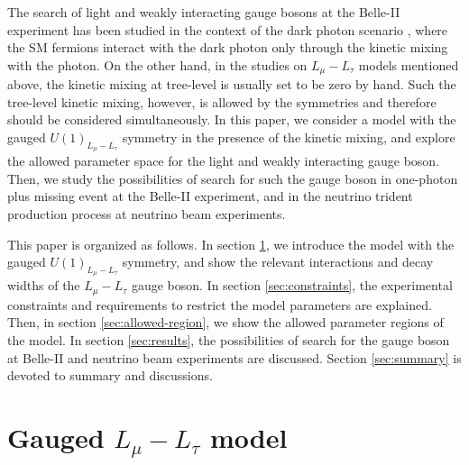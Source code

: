 \documentclass[preprint,amsmath,amssymb,superscriptaddress,nofootinbib]{revtex4}
\begin{document}
The search of light and weakly interacting gauge bosons at the Belle-II experiment has been studied 
in the context of the dark photon scenario \cite{Essig:2009nc, Essig:2013vha}, where the SM fermions interact with the dark 
photon only through the kinetic mixing with the photon. On the other hand, in the studies on $L_\mu - L_\tau$ models 
mentioned above,  the kinetic mixing at tree-level is usually set to be zero by hand. 
Such the tree-level kinetic mixing, however, is allowed by the symmetries and therefore should be considered simultaneously. 
In this paper, we consider a model with the gauged $U(1)_{L_\mu - L_\tau}$ symmetry in the presence of the kinetic 
mixing, and explore the allowed parameter space for the light and weakly interacting gauge boson. 
Then, we study the possibilities of search for such the gauge boson in one-photon plus missing event at the Belle-II experiment, 
and in the neutrino trident production process at neutrino beam experiments. 


This paper is organized as follows. 
In section \ref{sec:model}, we introduce the model with the gauged $U(1)_{L_\mu- L_\tau}$ symmetry, and show the relevant interactions 
and decay widths of the $L_\mu- L_\tau$ gauge boson.
In section \ref{sec:constraints}, the experimental constraints and requirements to restrict the model parameters are 
explained. Then, in section \ref{sec:allowed-region}, we show 
the allowed parameter regions of the model. In section \ref{sec:results}, the possibilities of search for the gauge boson 
at Belle-II and neutrino beam experiments are discussed. Section \ref{sec:summary} is devoted to summary and discussions.


\section{Gauged $L_\mu - L_\tau$ model} \label{sec:model}
\end{document}
